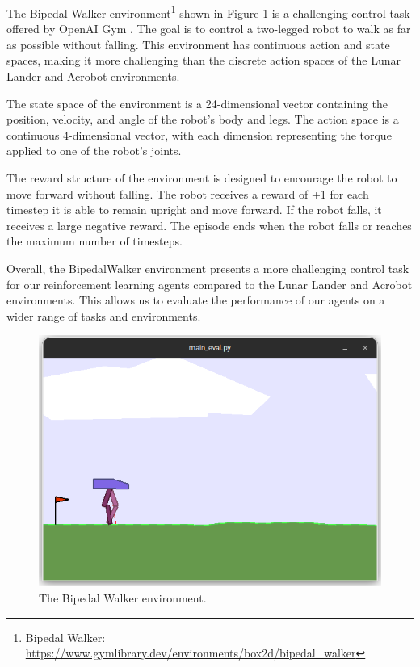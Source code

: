 \documentclass[conference]{IEEEtran}
\begin{document}
The Bipedal Walker environment\footnote{Bipedal Walker: \url{https://www.gymlibrary.dev/environments/box2d/bipedal_walker}} shown in Figure \ref{bipedal-walker-env} is a challenging control task offered by OpenAI Gym \cite{brockman2016openai}. The goal is to control a two-legged robot to walk as far as possible without falling. This environment has continuous action and state spaces, making it more challenging than the discrete action spaces of the Lunar Lander and Acrobot environments.

The state space of the environment is a 24-dimensional vector containing the position, velocity, and angle of the robot's body and legs. The action space is a continuous 4-dimensional vector, with each dimension representing the torque applied to one of the robot's joints.

The reward structure of the environment is designed to encourage the robot to move forward without falling. The robot receives a reward of +1 for each timestep it is able to remain upright and move forward. If the robot falls, it receives a large negative reward. The episode ends when the robot falls or reaches the maximum number of timesteps.

Overall, the BipedalWalker environment presents a more challenging control task for our reinforcement learning agents compared to the Lunar Lander and Acrobot environments. This allows us to evaluate the performance of our agents on a wider range of tasks and environments.

\begin{figure}[htbp]
    \centerline{\includegraphics[width=\columnwidth]{./img/bipedal-walker-env.png}}
    \caption{The Bipedal Walker environment.}
    \label{bipedal-walker-env}
\end{figure}
\end{document}
